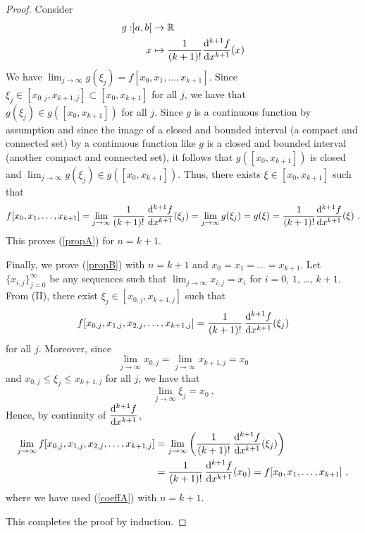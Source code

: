 \begin{proof}
Consider
\begin{align*}
  g: ]a,b[ & \to \mathbb{R} \\
  x & \mapsto \frac{1}{(k+1)!}\frac{\mathrm{d}^{k+1}{f}}{\mathrm{d}{x}^{k+1}}(x)
\end{align*}
We have
$\displaystyle \lim_{j\rightarrow \infty} g(\xi_j) = f[x_0,x_1,\ldots, x_{k+1}] $.
Since $\displaystyle
\xi_j \in [x_{0,j}, x_{k+1,j}] \subset [x_0,x_{k+1}]$ for all
$j$, we have that
$g(\xi_j) \in g([x_0,x_{k+1}])$ for all $j$.
Since $g$ is a continuous function by assumption and since
the image of a closed and bounded interval (a compact and connected
set) by a continuous function like $g$ is a closed and bounded
interval (another compact and connected set), it follows that
$g([x_0,x_{k+1}])$ is closed and
$\displaystyle \lim_{j\rightarrow \infty} g(\xi_j) \in g([x_0,x_{k+1}])$.
Thus, there exists $\xi \in [x_0,x_{k+1}]$
such that
\[
f[x_0,x_1,\ldots,x_{k+1}]
= \lim_{j\rightarrow \infty}
\frac{1}{(k+1)!}\,\frac{\mathrm{d}^{k+1}{f}}{\mathrm{d}{x}^{k+1}}(\xi_j)
= \lim_{j\rightarrow \infty} g(\xi_j) = g(\xi)
= \frac{1}{(k+1)!} \frac{\mathrm{d}^{k+1}{f}}{\mathrm{d}{x}^{k+1}}(\xi) \ .
\]
This proves (\ref{propA}) for $n=k+1$.

Finally, we prove (\ref{propB}) with $n=k+1$ and
$x_0 = x_1 = \ldots = x_{k+1}$.  Let
$\displaystyle \{x_{i,j}\}_{j=0}^\infty$ be
any sequences such that $\displaystyle \lim_{j\to \infty} x_{i,j} = x_i$
for $i=0$, $1$, \ldots, $k+1$.   From (II),
there exist $\xi_j \in [x_{0,j}, x_{k+1,j}]$ such that
\[
f[x_{0,j},x_{1,j},x_{2,j}, \ldots, x_{k+1,j}] =
\frac{1}{(k+1)!}\,\frac{\mathrm{d}^{k+1}{f}}{\mathrm{d}{x}^{k+1}}(\xi_j) 
\]
for all $j$.  Moreover, since
\[
\lim_{j\rightarrow \infty} x_{0,j} =
\lim_{j\rightarrow \infty} x_{k+1,j} = x_0
\]
and $x_{0,j} \leq \xi_j \leq x_{k+1,j}$ for all $j$, we have that
\[
\lim_{j\rightarrow \infty} \xi_j = x_0 \ .
\]
Hence, by continuity of $\displaystyle \frac{\mathrm{d}^{k+1}{f}}{\mathrm{d}{x}^{k+1}}$,
\begin{align*}
\lim_{j\rightarrow \infty}
f[x_{0,j}, x_{1,j}, x_{2,j}, \ldots, x_{k+1,j}]
&= \lim_{j\rightarrow \infty}
\left( \frac{1}{(k+1)!}\,\frac{\mathrm{d}^{k+1}{f}}{\mathrm{d}{x}^{k+1}}(\xi_j) \right) \\
&= \frac{1}{(k+1)!}\,\frac{\mathrm{d}^{k+1}{f}}{\mathrm{d}{x}^{k+1}}(x_0)
= f[x_0,x_1, \ldots, x_{k+1}] \ ,
\end{align*}
where we have used (\ref{coeffA}) with $n=k+1$.

This completes the proof by induction.
\end{proof}

